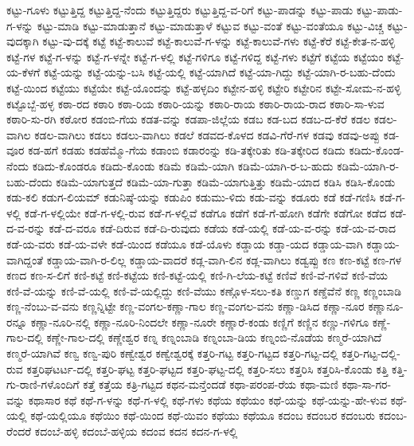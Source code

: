 ಕಟ್ಟು-ಗೂಳು
ಕಟ್ಟುತ್ತಿದ್ದ
ಕಟ್ಟುತ್ತಿದ್ದ-ನೆಂದು
ಕಟ್ಟುತ್ತಿದ್ದರು
ಕಟ್ಟುತ್ತಿದ್ದ-ವ-ರಿಗೆ
ಕಟ್ಟು-ಪಾಡನ್ನು
ಕಟ್ಟು-ಪಾಡು
ಕಟ್ಟು-ಪಾಡು-ಗ-ಳನ್ನು
ಕಟ್ಟು-ಮಾಡಿ
ಕಟ್ಟು-ಮಾಡುತ್ತಾನೆ
ಕಟ್ಟು-ಮಾಡುತ್ತಾಳೆ
ಕಟ್ಟುವ
ಕಟ್ಟು-ವಂತೆ
ಕಟ್ಟು-ವಂತೆಯೂ
ಕಟ್ಟು-ವಿಚ್ಚ
ಕಟ್ಟು-ವುದಕ್ಕಾಗಿ
ಕಟ್ಟು-ವು-ದಕ್ಕೆ
ಕಟ್ಟೆ
ಕಟ್ಟೆ-ಕಾಲುವೆ
ಕಟ್ಟೆ-ಕಾಲುವೆ-ಗ-ಳನ್ನು
ಕಟ್ಟೆ-ಕಾಲುವೆ-ಗಳು
ಕಟ್ಟೆ-ಕೆರೆ
ಕಟ್ಟೆ-ಕೇತ-ನ-ಹಳ್ಳಿ
ಕಟ್ಟೆ-ಗಳ
ಕಟ್ಟೆ-ಗ-ಳನ್ನು
ಕಟ್ಟೆ-ಗ-ಳನ್ನೇ
ಕಟ್ಟೆ-ಗ-ಳಲ್ಲಿ
ಕಟ್ಟೆ-ಗಳಿಗೂ
ಕಟ್ಟೆ-ಗಳಿದ್ದ
ಕಟ್ಟೆ-ಗಳು
ಕಟ್ಟೆಗೆ
ಕಟ್ಟೆಯ
ಕಟ್ಟೆಯಂ
ಕಟ್ಟೆ-ಯ-ಕೆಳಗೆ
ಕಟ್ಟೆ-ಯನ್ನು
ಕಟ್ಟೆ-ಯನ್ನು-ಬಸಿ
ಕಟ್ಟೆ-ಯಲ್ಲಿ
ಕಟ್ಟೆ-ಯಾಗಿದೆ
ಕಟ್ಟೆ-ಯಾ-ಗಿದ್ದು
ಕಟ್ಟೆ-ಯಾಗಿ-ರ-ಬಹು-ದೆಂದು
ಕಟ್ಟೆ-ಯಿಂದ
ಕಟ್ಟೆಯು
ಕಟ್ಟೆಯೇ
ಕಟ್ಟೆ-ಯೊಂದನ್ನು
ಕಟ್ಟೆ-ಹಳ್ಳದಿಂ
ಕಟ್ಟೇನ-ಹಳ್ಳಿ
ಕಟ್ಟೇರಿ
ಕಟ್ಟೇರಿನ
ಕಟ್ಟೇ-ಸೋಮ-ನ-ಹಳ್ಳಿ
ಕಟ್ಟೊಬ್ಬೆ-ಹಳ್ಳ
ಕಠಾ-ರದ
ಕಠಾರಿ
ಕಠಾ-ರಿಯ
ಕಠಾರಿ-ಯನ್ನು
ಕಠಾರಿ-ರಾಯ
ಕಠಾರಿ-ರಾಯ-ರಾದ
ಕಠಾರಿ-ಸಾ-ಳುವ
ಕಠಾರಿ-ಸು-ರಗಿ
ಕಠೋರ
ಕಡಂಬಿ-ಗೆಯ
ಕಡತ-ವನ್ನು
ಕಡಪಾ-ಜಿಲ್ಲೆಯ
ಕಡಬ
ಕಡ-ಬದ
ಕಡಬ-ದ-ಕೆರೆ
ಕಡಲ
ಕಡಲ-ವಾಗಿಲ
ಕಡಲ-ವಾಗಿಲು
ಕಡಲು
ಕಡಲು-ವಾಗಿಲು
ಕಡಲೆ
ಕಡವದ-ಕೊಳದ
ಕಡವಿ-ಗೆರೆ-ಗಳ
ಕಡವು
ಕಡವು-ಅಪ್ಪು
ಕಡ-ವೂರ
ಕಡ-ಹಗೆ
ಕಡಹು
ಕಡಹೆಮ್ಮೊ-ಗೆಯ
ಕಡಾಂಬಿ
ಕಡಾರಂನ್ನು
ಕಡಿ-ತಕ್ಕೇರಿತು
ಕಡಿ-ತಕ್ಕೇರಿದ
ಕಡಿದು
ಕಡಿದು-ಕೊಂಡ-ನೆಂದು
ಕಡಿದು-ಕೊಂಡರೂ
ಕಡಿದು-ಕೊಂಡು
ಕಡಿಮೆ
ಕಡಿಮೆ-ಯಾಗಿ
ಕಡಿಮೆ-ಯಾಗಿ-ರ-ಬ-ಹುದು
ಕಡಿಮೆ-ಯಾಗಿ-ರ-ಬಹು-ದೆಂದು
ಕಡಿಮೆ-ಯಾಗುತ್ತದೆ
ಕಡಿಮೆ-ಯಾ-ಗುತ್ತಾ
ಕಡಿಮೆ-ಯಾಗುತ್ತಿತ್ತು
ಕಡಿಮೆ-ಯಾದ
ಕಡಿಸಿ
ಕಡಿಸಿ-ಕೊಂಡು
ಕಡು-ಕಲಿ
ಕಡುಗ-ಲಿಯಮ್
ಕಡುನಿಷ್ಠೆ-ಯನ್ನು
ಕಡುಪಿಂ
ಕಡುಮು-ಳಿದು
ಕಡು-ವನ್ನು
ಕಡೂರು
ಕಡೆ
ಕಡೆ-ಗಣಿಸಿ
ಕಡೆ-ಗ-ಳಲ್ಲಿ
ಕಡೆ-ಗ-ಳಲ್ಲಿಯೇ
ಕಡೆ-ಗ-ಳಲ್ಲಿ-ರುವ
ಕಡೆ-ಗ-ಳಲ್ಲಿವೆ
ಕಡೆಗೂ
ಕಡೆಗೆ
ಕಡೆ-ಗೆ-ಹೋಗಿ
ಕಡೆಗೇ
ಕಡೆಗೋ
ಕಡೆದ
ಕಡೆ-ದ-ವ-ರನ್ನು
ಕಡೆ-ದ-ವರೂ
ಕಡೆ-ದಿರುವ
ಕಡೆ-ದಿ-ರುವುದು
ಕಡೆಯ
ಕಡೆ-ಯಲ್ಲಿ
ಕಡೆ-ಯ-ವ-ರನ್ನು
ಕಡೆ-ಯ-ವ-ರಾದ
ಕಡೆ-ಯ-ವರು
ಕಡೆ-ಯ-ವಳೇ
ಕಡೆ-ಯಿಂದ
ಕಡೆಯೂ
ಕಡೆ-ಯೊಳು
ಕಡ್ಡಾಯ
ಕಡ್ಡಾ-ಯದ
ಕಡ್ಡಾಯ-ವಾಗಿ
ಕಡ್ಡಾಯ-ವಾಗಿದ್ದಂತೆ
ಕಡ್ಡಾಯ-ವಾಗಿ-ರ-ಲಿಲ್ಲ
ಕಡ್ಡಾಯ-ವಾದರೆ
ಕಡ್ಲ-ವಾಗಿ-ಲಿನ
ಕಡ್ಲ-ವಾಗಿಲು
ಕಡ್ವಪ್ಪು
ಕಣ
ಕಣ-ಕಟ್ಟೆ
ಕಣ-ಗಳ
ಕಣದ
ಕಣ-ಸ-ಲಿಗೆ
ಕಣಿ-ಕಟ್ಟೆ
ಕಣಿ-ಕಟ್ಟೆಯ
ಕಣಿ-ಕಟ್ಟೆ-ಯಲ್ಲಿ
ಕಣಿ-ಗಿ-ಲೆಯ-ಕಟ್ಟೆ
ಕಣಿವೆ
ಕಣಿ-ವೆ-ಗಳಿವೆ
ಕಣಿ-ವೆಯ
ಕಣಿ-ವೆ-ಯನ್ನು
ಕಣಿ-ವೆ-ಯಲ್ಲಿ
ಕಣಿ-ವೆ-ಯಲ್ಲಿದ್ದು
ಕಣಿ-ವೆಯು
ಕಣ್ಗೊಳ-ಸಲು-ಕತಿ
ಕಣ್ಡುಗ
ಕಣ್ಡೆವೆನೆ
ಕಣ್ಣ
ಕಣ್ಣಂಬಾಡಿ
ಕಣ್ಣ-ನೆಂಬು-ವ-ವನು
ಕಣ್ಣನ್ನಿಟ್ಟೇ
ಕಣ್ಣ-ವಂಗಲ-ಕಣ್ಣಾ-ಗಾಲ
ಕಣ್ಣ-ವಂಗಲ-ವನು
ಕಣ್ಣಾ-ಡಿಸಿದ
ಕಣ್ಣಾ-ನೂರ
ಕಣ್ಣಾನೂ-ರನ್ನೂ
ಕಣ್ಣಾ-ನೂರಿ-ನಲ್ಲಿ
ಕಣ್ಣಾ-ನೂರಿ-ನಿಂದಲೇ
ಕಣ್ಣಾ-ನೂರೇ
ಕಣ್ಣಾರೆ-ಕಂಡು
ಕಣ್ಣಿಗೆ
ಕಣ್ಣಿನ
ಕಣ್ಣು-ಗಳಿಗೂ
ಕಣ್ಣೆ-ಗಾಲ-ದಲ್ಲಿ
ಕಣ್ಣೇ-ಗಾಲ-ದಲ್ಲಿ
ಕಣ್ಣೇಶ್ವರ
ಕಣ್ನ
ಕಣ್ನಂಬಾಡಿ
ಕಣ್ನಂಬಾ-ಡಿಯ
ಕಣ್ನಂಬಿ-ನೊಡೆಯ
ಕಣ್ಮರೆ-ಯಾಗಿದೆ
ಕಣ್ಮರೆ-ಯಾಗಿವೆ
ಕಣ್ವ
ಕಣ್ವ-ಪುರಿ
ಕಣ್ವೇಶ್ವರ
ಕಣ್ವೇಶ್ವರಕ್ಕೆ
ಕತ್ತರಿ-ಗಟ್ಟ
ಕತ್ತರಿ-ಗಟ್ಟದ
ಕತ್ತರಿ-ಗಟ್ಟ-ದಲ್ಲಿ
ಕತ್ತರಿ-ಗಟ್ಟ-ದಲ್ಲಿ-ರುವ
ಕತ್ತರಿಘಟರ್ಟ-ದಲ್ಲಿ
ಕತ್ತರಿ-ಘಟ್ಟ
ಕತ್ತರಿ-ಘಟ್ಟದ
ಕತ್ತರಿ-ಘಟ್ಟ-ದಲ್ಲಿ
ಕತ್ತರಿ-ಸಲು
ಕತ್ತರಿಸಿ
ಕತ್ತರಿಸಿ-ಕೊಂಡು
ಕತ್ತಿ
ಕತ್ತಿ-ಗು-ರಾಣಿ-ಗಳೊಂದಿಗೆ
ಕತ್ತೆ
ಕತ್ತೆಯ
ಕತ್ರಿ-ಗಟ್ಟದ
ಕಥನ-ಮನ್ತೆಂದಡೆ
ಕಥಾ-ಪರಂಪ-ರೆಯ
ಕಥಾ-ಮಣಿ
ಕಥಾ-ಸಾ-ಗರ-ವನ್ನು
ಕಥಾಸಾರ
ಕಥೆ
ಕಥೆ-ಗ-ಳನ್ನು
ಕಥೆ-ಗ-ಳಲ್ಲಿ
ಕಥೆ-ಗಳು
ಕಥೆಯ
ಕಥೆಯಂ
ಕಥೆ-ಯನ್ನು
ಕಥೆ-ಯನ್ನು-ಹೇ-ಳುವ
ಕಥೆ-ಯಲ್ಲಿ
ಕಥೆ-ಯಲ್ಲಿಯೂ
ಕಥೆಯಿಂ
ಕಥೆ-ಯಿಂದ
ಕಥೆ-ಯಿವಂ
ಕಥೆಯು
ಕಥೆಯೂ
ಕದಂಬ
ಕದಂಬರ
ಕದಂಬರು
ಕದಂಬ-ರೆಂದರೆ
ಕದಂಬೆ-ಹಳ್ಳಿ
ಕದಂಬೆ-ಹಳ್ಳಿಯ
ಕದಂವ
ಕದನ
ಕದನ-ಗ-ಳಲ್ಲಿ
